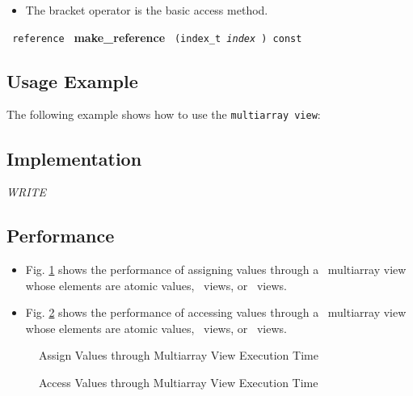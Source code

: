 \begin{itemize}
\item
The bracket operator is the basic access method.
\end{itemize}

\noindent
\texttt{%
reference
}
\newline
\textbf{make\_reference}%
\texttt{%
(index\_t
\textit{index}%
) const
}

\subsection{Usage Example} \label{sec-multi-vw-use}

The following example shows how to use the \texttt{multiarray view}:


\subsection{Implementation} \label{sec-multi-vw-impl}

\textit{WRITE}

\subsection{Performance} \label{sec-multi-vw-perf}

\begin{itemize}
\item
Fig. \ref{fig:multi-vw-assign-exper}
shows the performance of assigning values through a \stapl\ multiarray view
whose elements are atomic values, \stl\ views, or \stapl\ views.
\item
Fig. \ref{fig:multi-vw-access-exper}
shows the performance of accessing values through a \stapl\ multiarray view
whose elements are atomic values, \stl\ views, or \stapl\ views.
\end{itemize}

\begin{figure}[p]
\caption{Assign Values through Multiarray View Execution Time}
\label{fig:multi-vw-assign-exper}
\end{figure}

\begin{figure}[p]
\caption{Access Values through Multiarray View Execution Time}
\label{fig:multi-vw-access-exper}
\end{figure}

